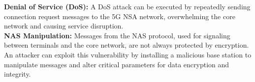 \documentclass[english]{article}
\begin{document}
\textbf{Denial of Service (DoS):} A DoS attack can be executed by repeatedly sending
connection request messages to the 5G NSA network, overwhelming the core network and
causing service disruption.
\\[0.2cm]

\textbf{NAS Manipulation:} Messages from the NAS protocol, used for signaling between
terminals and the core network, are not always protected by encryption. An attacker
can exploit this vulnerability by installing a malicious base station to manipulate
messages and alter critical parameters for data encryption and integrity.
\\[0.2cm]
\end{document}
